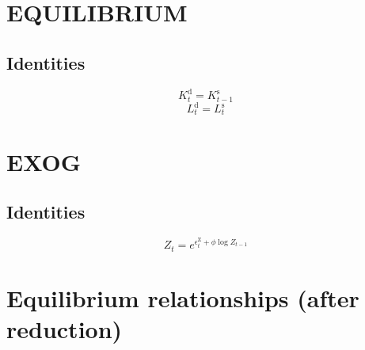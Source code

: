 \section{EQUILIBRIUM}

\subsection{Identities}

\begin{equation}
K^{\mathrm{d}}_{t} = K^{\mathrm{s}}_{t-1}
\end{equation}
\begin{equation}
L^{\mathrm{d}}_{t} = L^{\mathrm{s}}_{t}
\end{equation}




\section{EXOG}

\subsection{Identities}

\begin{equation}
Z_{t} = e^{\epsilon^{\mathrm{Z}}_{t} + {\phi} {\log{Z_{t-1}}}}
\end{equation}




\section{Equilibrium relationships (after reduction)}

